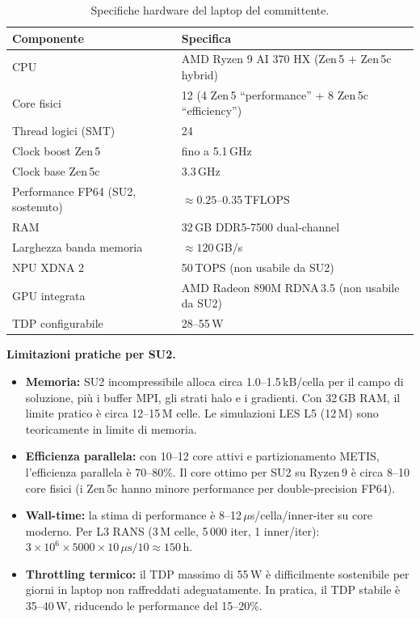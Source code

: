 \documentclass[11pt,a4paper]{article}
\newcommand{\mus}{\,\mu\mathrm{s}}
\begin{document}
\begin{table}[H]
  \centering
  \caption{Specifiche hardware del laptop del committente.}
  \label{tab:laptop}
  \begin{tabular}{ll}
    \toprule
    \rowcolor{tablehead}
    \textbf{Componente} & \textbf{Specifica} \\
    \midrule
    CPU & AMD Ryzen 9 AI 370 HX (Zen\,5 + Zen\,5c hybrid) \\
    Core fisici & 12 (4 Zen\,5 ``performance'' + 8 Zen\,5c ``efficiency'') \\
    Thread logici (SMT) & 24 \\
    Clock boost Zen\,5 & fino a 5.1\,GHz \\
    Clock base Zen\,5c & 3.3\,GHz \\
    Performance FP64 (SU2, sostenuto) & $\approx 0.25$--0.35\,TFLOPS \\
    RAM & 32\,GB DDR5-7500 dual-channel \\
    Larghezza banda memoria & $\approx 120$\,GB/s \\
    NPU XDNA 2 & 50\,TOPS (non usabile da SU2) \\
    GPU integrata & AMD Radeon 890M RDNA\,3.5 (non usabile da SU2) \\
    TDP configurabile & 28--55\,W \\
    \bottomrule
  \end{tabular}
\end{table}

\textbf{Limitazioni pratiche per SU2.}

\begin{itemize}
  \item \textbf{Memoria:} SU2 incompressibile alloca circa 1.0--1.5\,kB/cella per il campo di soluzione, più i buffer MPI, gli strati halo e i gradienti. Con 32\,GB RAM, il limite pratico è circa 12--15\,M celle. Le simulazioni LES L5 (12\,M) sono teoricamente in limite di memoria.
  \item \textbf{Efficienza parallela:} con 10--12 core attivi e partizionamento METIS, l'efficienza parallela è 70--80\%. Il core ottimo per SU2 su Ryzen\,9 è circa 8--10 core fisici (i Zen\,5c hanno minore performance per double-precision FP64).
  \item \textbf{Wall-time:} la stima di performance è 8--12\,$\mu$s/cella/inner-iter su core moderno. Per L3 RANS (3\,M celle, 5\,000 iter, 1 inner/iter): $3\times10^6 \times 5000 \times 10\mus / 10 \approx 150$\,h.
  \item \textbf{Throttling termico:} il TDP massimo di 55\,W è difficilmente sostenibile per giorni in laptop non raffreddati adeguatamente. In pratica, il TDP stabile è 35--40\,W, riducendo le performance del 15--20\%.
\end{itemize}
\end{document}
